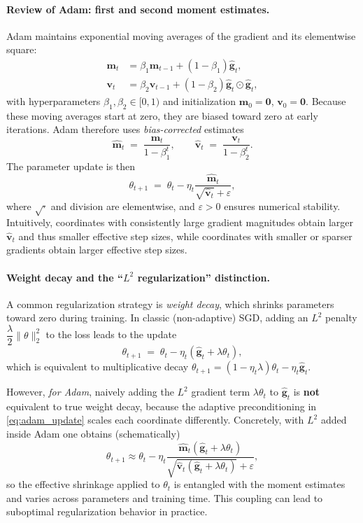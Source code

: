 \paragraph{Review of Adam: first and second moment estimates.}
Adam maintains exponential moving averages of the gradient and its elementwise square:
\begin{align}
\mathbf{m}_t &= \beta_1 \mathbf{m}_{t-1} + (1-\beta_1)\hat{\mathbf{g}}_t, \label{eq:adam_m}\\
\mathbf{v}_t &= \beta_2 \mathbf{v}_{t-1} + (1-\beta_2)\hat{\mathbf{g}}_t \odot \hat{\mathbf{g}}_t, \label{eq:adam_v}
\end{align}
with hyperparameters $\beta_1,\beta_2\in[0,1)$ and initialization $\mathbf{m}_0=\mathbf{0}$, $\mathbf{v}_0=\mathbf{0}$. Because these moving averages start at zero, they are biased toward zero at early iterations. Adam therefore uses \emph{bias-corrected} estimates
\begin{equation}
\hat{\mathbf{m}}_t \;=\; \frac{\mathbf{m}_t}{1-\beta_1^t},
\qquad
\hat{\mathbf{v}}_t \;=\; \frac{\mathbf{v}_t}{1-\beta_2^t}.
\label{eq:adam_biascorr}
\end{equation}
The parameter update is then
\begin{equation}
\theta_{t+1}
\;=\;
\theta_t
-
\eta_t \frac{\hat{\mathbf{m}}_t}{\sqrt{\hat{\mathbf{v}}_t}+\varepsilon},
\label{eq:adam_update}
\end{equation}
where $\sqrt{\cdot}$ and division are elementwise, and $\varepsilon>0$ ensures numerical stability. Intuitively, coordinates with consistently large gradient magnitudes obtain larger $\hat{\mathbf{v}}_t$ and thus smaller effective step sizes, while coordinates with smaller or sparser gradients obtain larger effective step sizes.

\paragraph{Weight decay and the ``$L^2$ regularization'' distinction.}
A common regularization strategy is \emph{weight decay}, which shrinks parameters toward zero during training. In classic (non-adaptive) SGD, adding an $L^2$ penalty $\dfrac{\lambda}{2}\|\theta\|_2^2$ to the loss leads to the update
\[
\theta_{t+1} \;=\; \theta_t - \eta_t\left(\hat{\mathbf{g}}_t + \lambda \theta_t\right),
\]
which is equivalent to multiplicative decay $\theta_{t+1}=(1-\eta_t\lambda)\theta_t-\eta_t\hat{\mathbf{g}}_t$.

However, \emph{for Adam}, naively adding the $L^2$ gradient term $\lambda\theta_t$ to $\hat{\mathbf{g}}_t$ is \textbf{not} equivalent to true weight decay, because the adaptive preconditioning in \eqref{eq:adam_update} scales each coordinate differently. Concretely, with $L^2$ added inside Adam one obtains (schematically)
\[
\theta_{t+1} \approx \theta_t - \eta_t \frac{\hat{\mathbf{m}}_t(\hat{\mathbf{g}}_t+\lambda\theta_t)}{\sqrt{\hat{\mathbf{v}}_t(\hat{\mathbf{g}}_t+\lambda\theta_t)}+\varepsilon},
\]
so the effective shrinkage applied to $\theta_t$ is entangled with the moment estimates and varies across parameters and training time. This coupling can lead to suboptimal regularization behavior in practice.

